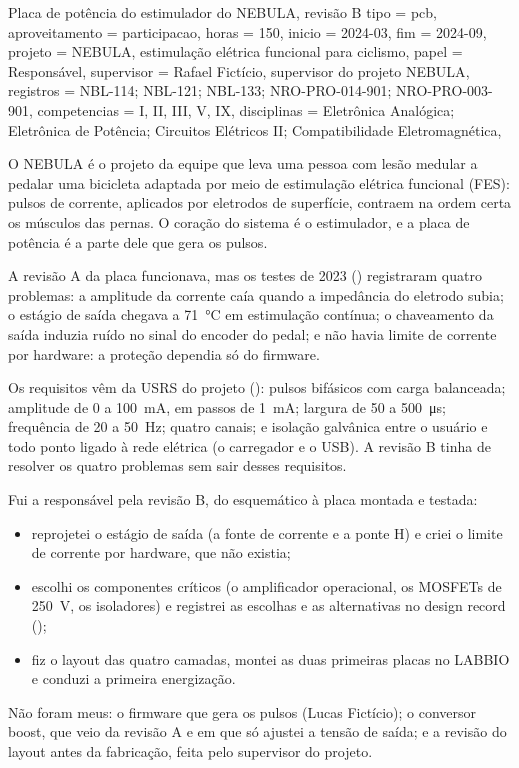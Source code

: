 \begin{atividade}{Placa de potência do estimulador do NEBULA, revisão B}{
  tipo         = pcb,
  aproveitamento = participacao,
  horas        = 150,
  inicio       = 2024-03,
  fim          = 2024-09,
  projeto      = {NEBULA, estimulação elétrica funcional para ciclismo},
  papel        = Responsável,
  supervisor   = {Rafael Fictício, supervisor do projeto NEBULA},
  registros    = {NBL-114; NBL-121; NBL-133; NRO-PRO-014-901; NRO-PRO-003-901},
  competencias = {I, II, III, V, IX},
  disciplinas  = {Eletrônica Analógica; Eletrônica de Potência; Circuitos Elétricos II; Compatibilidade Eletromagnética},
}

\begin{contexto}
O NEBULA é o projeto da equipe que leva uma pessoa com lesão medular a pedalar uma bicicleta
adaptada por meio de estimulação elétrica funcional (FES): pulsos de corrente, aplicados por eletrodos
de superfície, contraem na ordem certa os músculos das pernas. O coração do sistema é o estimulador,
e a placa de potência é a parte dele que gera os pulsos.

A revisão A da placa funcionava, mas os testes de 2023 () registraram quatro
problemas: a amplitude da corrente caía quando a impedância do eletrodo subia; o estágio de saída
chegava a \SI{71}{\celsius} em estimulação contínua; o chaveamento da saída induzia ruído no sinal do
encoder do pedal; e não havia limite de corrente por hardware: a proteção dependia só do firmware.

Os requisitos vêm da USRS do projeto (): pulsos bifásicos com carga
balanceada; amplitude de 0 a \SI{100}{\milli\ampere}, em passos de \SI{1}{\milli\ampere}; largura de
50 a \SI{500}{\micro\second}; frequência de 20 a \SI{50}{\hertz}; quatro canais; e isolação galvânica
entre o usuário e todo ponto ligado à rede elétrica (o carregador e o USB). A revisão B tinha de
resolver os quatro problemas sem sair desses requisitos.
\end{contexto}

\begin{contribuicao}
Fui a responsável pela revisão B, do esquemático à placa montada e testada:
\begin{itemize}
  \item reprojetei o estágio de saída (a fonte de corrente e a ponte H) e criei o limite de corrente
    por hardware, que não existia;
  \item escolhi os componentes críticos (o amplificador operacional, os MOSFETs de \SI{250}{\volt}, os
    isoladores) e registrei as escolhas e as alternativas no design record ();
  \item fiz o layout das quatro camadas, montei as duas primeiras placas no LABBIO e conduzi a primeira
    energização.
\end{itemize}
Não foram meus: o firmware que gera os pulsos (Lucas Fictício); o conversor boost, que veio da
revisão A e em que só ajustei a tensão de saída; e a revisão do layout antes da fabricação, feita pelo
supervisor do projeto.
\end{contribuicao}


\end{atividade}
